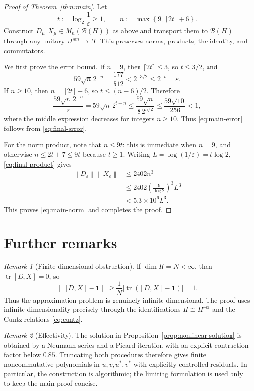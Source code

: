 \documentclass[11pt]{amsart}
\numberwithin{equation}{section}
\theoremstyle{remark}
\newtheorem{remark}[remark]{Remark}
\newcommand{\one}{\mathbf 1}
\newcommand{\norm}[1]{\left\lVert #1\right\rVert}
\newcommand{\abs}[1]{\left\lvert #1\right\rvert}
\begin{document}
\begin{proof}[Proof of Theorem~\ref{thm:main}]
Let
\[
 t:=\log_2\frac1\varepsilon\geq1,
 \qquad
 n:=\max\left\{9,\,\lceil2t\rceil+6\right\}.
\]
Construct $D_\mu,X_\mu\in M_n(\mathcal B(H))$ as above and transport them to
$\mathcal B(H)$ through any unitary $H^{\oplus n}\to H$.  This preserves
norms, products, the identity, and commutators.

We first prove the error bound.  If $n=9$, then
$\lceil2t\rceil\leq3$, so $t\leq3/2$, and
\[
 59\sqrt n\,2^{-n}
 =\frac{177}{512}
 <2^{-3/2}
 \leq2^{-t}=\varepsilon.
\]
If $n\geq10$, then $n=\lceil2t\rceil+6$, so
$t\leq(n-6)/2$.  Therefore
\[
 \frac{59\sqrt n\,2^{-n}}{\varepsilon}
 =59\sqrt n\,2^{t-n}
 \leq\frac{59\sqrt n}{8\,2^{n/2}}
 \leq\frac{59\sqrt{10}}{256}<1,
\]
where the middle expression decreases for integers $n\geq10$.
Thus \eqref{eq:main-error} follows from \eqref{eq:final-error}.

For the norm product, note that $n\leq9t$: this is immediate when $n=9$, and
otherwise
$n\leq2t+7\leq9t$ because $t\geq1$.  Writing
$L=\log(1/\varepsilon)=t\log2$, \eqref{eq:final-product} gives
\begin{align*}
 \norm{D_\varepsilon}\norm{X_\varepsilon}
 &\leq2402n^3\\
 &\leq2402\left(\frac9{\log2}\right)^3L^3\\
 &<5.3\times10^6L^3.
\end{align*}
This proves \eqref{eq:main-norm} and completes the proof.
\end{proof}

\section{Further remarks}

\begin{remark}[Finite-dimensional obstruction]
If $\dim H=N<\infty$, then $\operatorname{tr}[D,X]=0$, so
\[
 \norm{[D,X]-\one}
 \geq\frac1N\abs{\operatorname{tr}([D,X]-\one)}=1.
\]
Thus the approximation problem is genuinely infinite-dimensional.  The proof
uses infinite dimensionality precisely through the identifications
$H\cong H^{\oplus n}$ and the Cuntz relations \eqref{eq:cuntz}.
\end{remark}

\begin{remark}[Effectivity]
The solution in Proposition~\ref{prop:nonlinear-solution} is obtained by a Neumann series
and a Picard iteration with an explicit contraction factor below $0.85$.
Truncating both procedures therefore gives finite noncommutative polynomials in
$u,v,u^*,v^*$ with explicitly controlled residuals.  In particular, the
construction is algorithmic; the limiting formulation is used only to keep the
main proof concise.
\end{remark}
\end{document}
